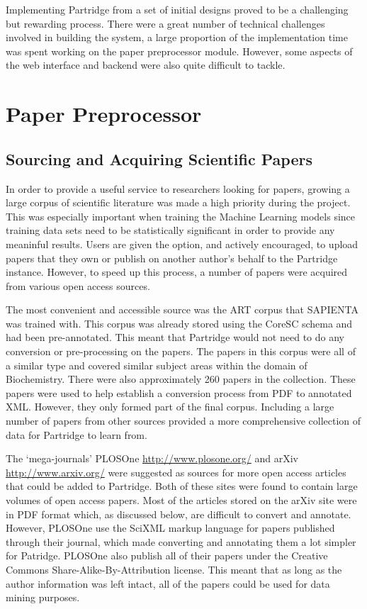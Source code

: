 %  
%

Implementing Partridge from a set of initial designs proved to be a
challenging but rewarding process. There were a great number of technical
challenges involved in building the system, a large proportion of the
implementation time was spent working on the paper preprocessor module.
However, some aspects of the web interface and backend were also quite
difficult to tackle. 

\section{Paper Preprocessor}

\subsection{ Sourcing and Acquiring Scientific Papers}

In order to provide a useful service to researchers looking for papers, growing
a large corpus of scientific literature was made a high priority during the
project. This was especially important when training the Machine Learning
models since training data sets need to be statistically significant in order
to provide any meaninful results. Users are given the option, and actively
encouraged, to upload papers that they own or publish on another author's
behalf to the Partridge instance. However, to speed up this process, a number
of papers were acquired from various open access sources.

The most convenient and accessible source was the ART corpus that SAPIENTA was
trained with\cite{citeulike:11077287}. This corpus was already stored using the
CoreSC schema and had been pre-annotated. This meant that Partridge would not
need to do any conversion or pre-processing on the papers. The papers in this
corpus were all of a similar type and covered similar subject areas within the
domain of Biochemistry. There were also approximately 260 papers in the
collection. These papers were used to help establish a conversion process from
PDF to annotated XML. However, they only formed part of the final corpus.
Including a large number of papers from other sources provided a more
comprehensive collection of data for Partridge to learn from.

The `mega-journals' PLOSOne \url{http://www.plosone.org/} and arXiv
\url{http://www.arxiv.org/} were suggested as sources for more open access
articles that could be added to Partridge. Both of these sites were found to
contain large volumes of open access papers. Most of the articles stored on the
arXiv site were in PDF format which, as discussed below, are difficult to
convert and annotate. However, PLOSOne use the SciXML markup language for
papers published through their journal, which made converting and annotating
them a lot simpler for Patridge. PLOSOne also publish all of their papers under
the Creative Commons Share-Alike-By-Attribution license\cite{ccbyattr}. This
meant that as long as the author information was left intact, all of the papers
could be used for data mining purposes.

